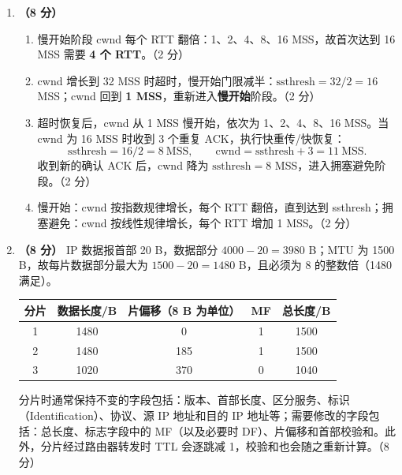 \documentclass[a4paper,11pt]{article}
\begin{document}
\begin{enumerate}[start=13, label=\textbf{\arabic*.}, leftmargin=2.4em, itemsep=0.45em]
\item \textbf{（8 分）}
\begin{enumerate}[label=（\arabic*）, leftmargin=2.2em, itemsep=1pt]
  \item 慢开始阶段 cwnd 每个 RTT 翻倍：1、2、4、8、16 MSS，故首次达到 16 MSS 需要 \textbf{4 个 RTT}。\hfill（2 分）
  \item cwnd 增长到 32 MSS 时超时，慢开始门限减半：$\text{ssthresh}=32/2=16$ MSS；cwnd 回到 \textbf{1 MSS}，重新进入\textbf{慢开始}阶段。\hfill（2 分）
  \item 超时恢复后，cwnd 从 1 MSS 慢开始，依次为 1、2、4、8、16 MSS。当 cwnd 为 16 MSS 时收到 3 个重复 ACK，执行快重传/快恢复：
  \[
  \text{ssthresh}=16/2=8\ \text{MSS},\qquad \text{cwnd}=\text{ssthresh}+3=11\ \text{MSS}.
  \]
  收到新的确认 ACK 后，cwnd 降为 $\text{ssthresh}=8$ MSS，进入拥塞避免阶段。\hfill（2 分）
  \item 慢开始：cwnd 按指数规律增长，每个 RTT 翻倍，直到达到 ssthresh；拥塞避免：cwnd 按线性规律增长，每个 RTT 增加 1 MSS。\hfill（2 分）
\end{enumerate}

\item \textbf{（8 分）}
IP 数据报首部 20 B，数据部分 $4000-20=3980$ B；MTU 为 1500 B，故每片数据部分最大为 $1500-20=1480$ B，且必须为 8 的整数倍（1480 满足）。
\begin{center}\small
\begin{tabular}{ccccc}
\toprule
分片 & 数据长度/B & 片偏移（8 B 为单位） & MF & 总长度/B \\
\midrule
1 & 1480 & 0 & 1 & 1500 \\
2 & 1480 & 185 & 1 & 1500 \\
3 & 1020 & 370 & 0 & 1040 \\
\bottomrule
\end{tabular}
\end{center}
分片时通常保持不变的字段包括：版本、首部长度、区分服务、标识（Identification）、协议、源 IP 地址和目的 IP 地址等；需要修改的字段包括：总长度、标志字段中的 MF（以及必要时 DF）、片偏移和首部校验和。此外，分片经过路由器转发时 TTL 会逐跳减 1，校验和也会随之重新计算。\hfill（8 分）


\end{enumerate}
\end{document}
